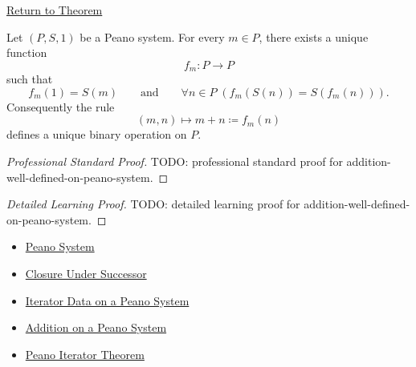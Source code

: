 \newpage
{}
\label{prf:addition-well-defined-on-peano-system}

\begin{remark*}[Return]
\hyperref[thm:addition-well-defined-on-peano-system]{Return to Theorem}
\end{remark*}

\begin{remark*}
\end{remark*}

\begin{theorem*}
Let $(P,S,1)$ be a Peano system. For every $m \in P$, there exists a unique
function
\[
f_m : P \to P
\]
such that
\[
f_m(1)=S(m)
\qquad\text{and}\qquad
\forall n \in P\;(f_m(S(n))=S(f_m(n))).
\]
Consequently the rule
\[
(m,n) \longmapsto m+n \coloneqq f_m(n)
\]
defines a unique binary operation on $P$.
\end{theorem*}

\begin{proof}[Professional Standard Proof]
\LRAProofBodyStart
TODO: professional standard proof for addition-well-defined-on-peano-system.
\end{proof}

\begin{proof}[Detailed Learning Proof]
\LRAProofBodyStart
TODO: detailed learning proof for addition-well-defined-on-peano-system.
\end{proof}

\begin{remark*}
\end{remark*}

\begin{dependencies}
\begin{itemize}
  \item \hyperref[def:peano-system]{Peano System}
  \item \hyperref[ax:peano-successor-closure]{Closure Under Successor}
  \item \hyperref[def:iterator-data-on-peano-system]{Iterator Data on a Peano System}
  \item \hyperref[def:addition-on-peano-system]{Addition on a Peano System}
  \item \hyperref[thm:peano-iterator-theorem]{Peano Iterator Theorem}
\end{itemize}
\end{dependencies}

\clearpage
